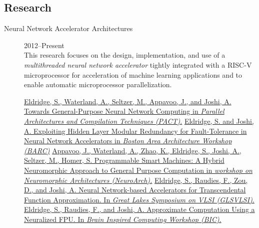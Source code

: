 \documentclass[letterpage]{article}
\begin{document}
\begin{minipage}[t]{0.59\textwidth}
  \subsection*{Research}
  \vspace{-5pt}
  \begin{description}
  \item[Neural Network Accelerator Architectures] \hfill
    2012--Present\\ This research focuses on the design,
    implementation, and use of a \emph{multithreaded neural network accelerator} tightly integrated with a RISC-V microprocessor for acceleration of machine learning applications and to enable automatic microprocessor parallelization.
    \begingroup
    \renewcommand{\section}[2]{}
    \begin{thebibliography}{2014}
      \href{}{Eldridge, S., Waterland, A., Seltzer, M., Appavoo, J., and Joshi, A. Towards General-Purpose Neural Network Computing in {\em
          Parallel Architectures and Compilation Techniques (PACT)}.}
      \href{http://people.bu.edu/schuye/files/barc2015-eldridge-paper.pdf}{Eldridge, S. and Joshi, A. Exploiting Hidden Layer Modular Redundancy for Fault-Tolerance in Neural Network Accelerators in \em{Boston Area Architecture Workshop (BARC)}}
      \href{http://people.bu.edu/schuye/files/appavoo-neuroarch-2014.pdf}{Appavoo,
        J., Waterland, A., Zhao, K., Eldridge, S., Joshi, A., Seltzer,
        M., Homer, S. Programmable Smart Machines: A Hybrid
        Neuromorphic Approach to General Purpose Computation in {\em workshop on Neuromorphic Architectures (NeuroArch).}}
      \href{http://people.bu.edu/schuye/files/glsvlsi2014-eldridge.pdf}{Eldridge,
        S., Raudies, F., Zou, D., and Joshi, A. Neural
        Network-based Accelerators for Transcendental Function
        Approximation. In {\em Great Lakes Symposium on VLSI (GLSVLSI)}.}
      \href{http://people.bu.edu/schuye/files/approx-fpu-bic2013.pdf}{Eldridge,
        S., Raudies, F., and Joshi, A. Approximate Computation
        Using a Neuralized FPU. In {\em Brain Inspired Computing Workshop (BIC)}.}
    \end{thebibliography}

\end{description}
\end{minipage}
\end{document}
